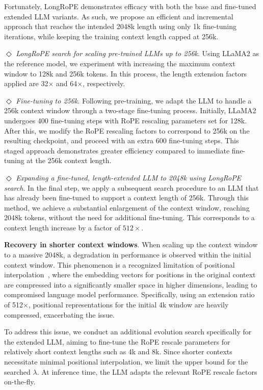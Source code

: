 Fortunately, LongRoPE demonstrates efficacy with both the base and fine-tuned extended LLM variants. As such, we propose an efficient and incremental approach that reaches the intended 2048k length using only 1k fine-tuning iterations, while keeping the training context length capped at 256k.

$\Diamond$ \textit{LongRoPE search for scaling pre-trained LLMs up to 256k}. Using LLaMA2 as the reference model, we experiment with increasing the maximum context window to 128k and 256k tokens. In this process, the length extension factors applied are 32$\times$ and 64$\times$, respectively.

$\Diamond$ \textit{Fine-tuning to 256k}. Following pre-training, we adapt the LLM to handle a 256k context window through a two-stage fine-tuning process. Initially, LLaMA2 undergoes 400 fine-tuning steps with RoPE rescaling parameters set for 128k. After this, we modify the RoPE rescaling factors to correspond to 256k on the resulting checkpoint, and proceed with an extra 600 fine-tuning steps. This staged approach demonstrates greater efficiency compared to immediate fine-tuning at the 256k context length.

$\Diamond$ \textit{Expanding a fine-tuned, length-extended LLM to 2048k using LongRoPE search}. In the final step, we apply a subsequent search procedure to an LLM that has already been fine-tuned to support a context length of 256k. Through this method, we achieve a substantial enlargement of the context window, reaching 2048k tokens, without the need for additional fine-tuning. This corresponds to a context length increase by a factor of $512\times$.

\textbf{Recovery in shorter context windows}. When scaling up the context window to a massive 2048k, a degradation in performance is observed within the initial context window. This phenomenon is a recognized limitation of positional interpolation~\cite{pi}, where the embedding vectors for positions in the original context are compressed into a significantly smaller space in higher dimensions, leading to compromised language model performance. Specifically, using an extension ratio of 512$\times$, positional representations for the initial 4k window are heavily compressed, exacerbating the issue.

To address this issue, we conduct an additional evolution search specifically for the extended LLM, aiming to fine-tune the RoPE rescale parameters for relatively short context lengths such as 4k and 8k. Since shorter contexts necessitate minimal positional interpolation, we limit the upper bound for the searched $\lambda$. At inference time, the LLM adapts the relevant RoPE rescale factors on-the-fly.

